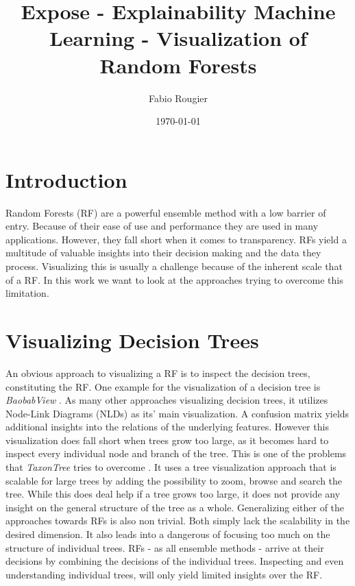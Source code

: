 \documentclass[a4paper, 12pt]{article}
\title{Expose - Explainability Machine Learning - Visualization of Random Forests}
\author{Fabio Rougier}
\date{\today}
\begin{document}
\maketitle

\tableofcontents
\clearpage
\section{Introduction}
Random Forests (RF) are a powerful ensemble method with a low barrier of entry. Because of their
ease of use and performance they are used in many applications. However, they fall short
when it comes to transparency.
RFs yield a multitude of valuable insights into their decision making and the data they
process. Visualizing this is usually a challenge because of the inherent scale that of a RF. 
In this work we want to look at the approaches trying to overcome this limitation.

\section{Visualizing Decision Trees}
An obvious approach to visualizing a RF is to inspect the decision trees, constituting the
RF. One example for the visualization of a decision tree is \textit{BaobabView}
\cite{van2011baobabview}. As many other approaches visualizing decision trees, it utilizes
Node-Link Diagrams (NLDs) as its' main visualization. A confusion matrix yields additional
insights into the relations of the underlying features.
However this visualization does fall short when trees grow too large, as it becomes hard to
inspect every individual node and branch of the tree.
This is one of the problems that \textit{TaxonTree} tries to overcome 
\cite{parr2003taxontree}. It uses a tree visualization approach that is scalable for large 
trees by adding the possibility to zoom, browse and search the tree. While this does deal
help if a tree grows too large, it does not provide any insight on the general structure of
the tree as a whole.
\linebreak
\linebreak
Generalizing either of the approaches towards RFs is also non trivial. Both simply lack the
scalability in the desired dimension. It also leads into a dangerous of focusing too much on
the structure of individual trees. RFs - as all ensemble methods - arrive at their decisions
by combining the decisions of the individual trees. Inspecting and even understanding
individual trees, will only yield limited insights over the RF.
\end{document}
